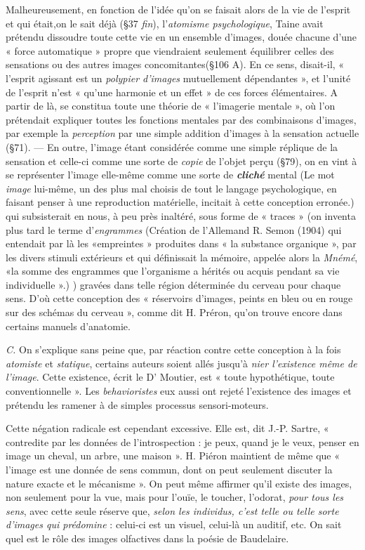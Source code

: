 Malheureusement, en fonction de l’idée qu’on se faisait alors de la
vie de l’esprit et qui était,on le sait déjà (\S 37 {\it fin}), l’{\it atomisme psychologique},
Taine avait prétendu dissoudre toute cette vie en un ensemble
d'images, douée chacune d’une « force automatique » propre que
viendraient seulement équilibrer celles des sensations ou des autres
images concomitantes(\S 106 A). En ce sens, disait-il, « l’esprit agissant
est un {\it polypier d'images} mutuellement dépendantes », et l’unité de
l'esprit n’est « qu’une harmonie et un effet » de ces forces élémentaires.
A partir de là, se constitua toute une théorie de « l'imagerie mentale »,
où l’on prétendait expliquer toutes les fonctions mentales par des
combinaisons d'images, par exemple la {\it perception} par une simple
addition d'images à la sensation actuelle (\S71). — En outre, l’image
étant considérée comme une simple réplique de la sensation et celle-ci
comme une sorte de {\it copie} de l’objet perçu (\S 79), on en vint à se
représenter l’image elle-même comme une sorte de \textbf{\textit {cliché}} mental
{\scriptsize (Le mot {\it image} lui-même, un des plus mal choisis de tout le langage psychologique,
en faisant penser à une reproduction matérielle, incitait à cette conception erronée.)}
qui subsisterait en nous, à peu près inaltéré, sous forme de « traces » (on
inventa plus tard le terme d’{\it engrammes}
{\scriptsize (Création de l'Allemand R. Semon (1904) qui entendait par là les «empreintes »
produites dans « la substance organique », par les divers stimuli extérieurs et qui
définissait la mémoire, appelée alors la {\it Mnémé}, «la somme des engrammes que
l'organisme a hérités ou acquis pendant sa vie individuelle ».)}
) gravées dans telle région
déterminée du cerveau pour chaque sens. D’où cette conception des
« réservoirs d'images, peints en bleu ou en rouge sur des schémas du
cerveau », comme dit H. Préron, qu’on trouve encore dans certains
manuels d'anatomie.

{\it C.} On s’explique sans peine que, par réaction contre cette conception
à la fois {\it atomiste} et {\it statique}, certains auteurs soient allés jusqu’à
{\it nier l'existence même de l’image}. Cette existence, écrit le D' Moutier,
est « toute hypothétique, toute conventionnelle ». Les {\it behavioristes}
eux aussi ont rejeté l’existence des images et prétendu les ramener
à de simples processus sensori-moteurs.

Cette négation radicale est cependant excessive. Elle est, dit
J.-P. Sartre, « contredite par les données de l’introspection : je
peux, quand je le veux, penser en image un cheval, un arbre, une
maison ». H. Piéron maintient de même que « l’image est une donnée
de sens commun, dont on peut seulement discuter la nature exacte
et le mécanisme ». On peut même affirmer qu’il existe des images,
non seulement pour la vue, mais pour l’ouïe, le toucher, l’odorat,
{\it pour tous les sens}, avec cette seule réserve que, {\it selon les individus,
c’est telle ou telle sorte d'images qui prédomine} : celui-ci est un visuel,
celui-là un auditif, etc. On sait quel est le rôle des images olfactives
dans la poésie de Baudelaire.

